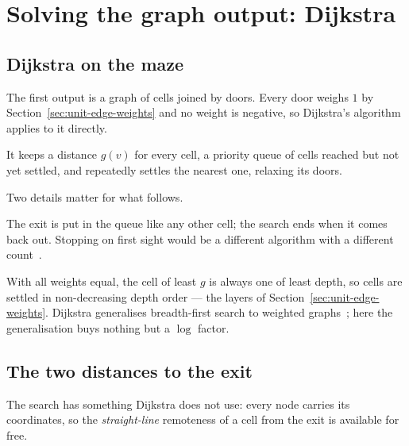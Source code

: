 \section{Solving the graph output: Dijkstra}
\label{sec:dijkstra}

\subsection{Dijkstra on the maze}

The first output is a graph of cells joined by doors. Every door weighs $1$ by
Section~\ref{sec:unit-edge-weights} and no weight is negative, so Dijkstra's
algorithm~\cite{dijkstra1959note} applies to it directly.

It keeps a distance $g(v)$ for every cell, a priority queue of cells reached but
not yet settled, and repeatedly settles the nearest one, relaxing its doors.

Two details matter for what follows.

\begin{description}[leftmargin=*,style=nextline,itemsep=5pt]
  \item[It stops when the exit is \emph{settled}, not when it is reached.] The
    exit is put in the queue like any other cell; the search ends when it comes
    back out. Stopping on first sight would be a different algorithm with a
    different count~\cite{holte2010misconceptions}.
  \item[On unit weights it is breadth-first search.] With all weights equal, the
    cell of least $g$ is always one of least depth, so cells are settled in
    non-decreasing depth order --- the layers of
    Section~\ref{sec:unit-edge-weights}. Dijkstra generalises breadth-first
    search to weighted graphs~\cite[Ch.~22]{cormen2022introduction}; here the
    generalisation buys nothing but a $\log$ factor.
\end{description}

\subsection{The two distances to the exit}

The search has something Dijkstra does not use: every node carries its
coordinates, so the \emph{straight-line} remoteness of a cell from the exit is
available for free.

